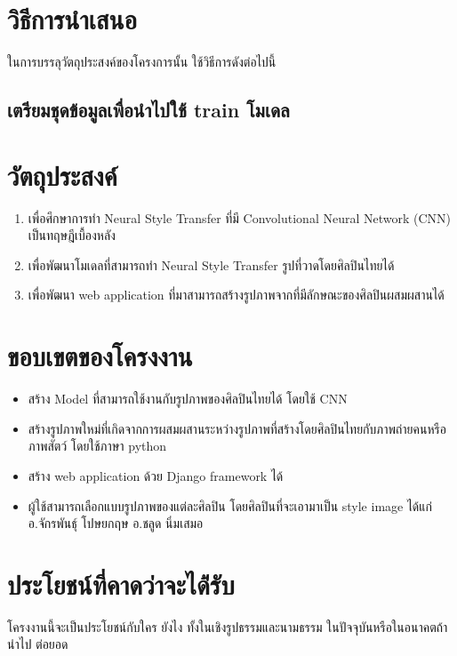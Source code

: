 \documentclass[12pt,oneside,openright,a4paper]{cpe-thai-project}
\begin{document}
\section{วิธีการนำเสนอ}
\par\setlength{\parindent}{5ex}ในการบรรลุวัตถุประสงค์ของโครงการนั้น ใช้วิธีการดังต่อไปนี้
\subsection{เตรียมชุดข้อมูลเพื่อนำไปใช้ train โมเดล}


\section{วัตถุประสงค์}
\begin{enumerate}
  \item	เพื่อศึกษาการทำ Neural Style Transfer ที่มี Convolutional Neural Network (CNN) เป็นทฤษฎีเบื้องหลัง
  \item เพื่อพัฒนาโมเดลที่สามารถทำ Neural Style Transfer รูปที่วาดโดยศิลปินไทยได้
  \item เพื่อพัฒนา web application ที่มาสามารถสร้างรูปภาพจากที่มีลักษณะของศิลปินผสมผสานได้
\end{enumerate}



\section{ขอบเขตของโครงงาน}

\begin{itemize}
\item  สร้าง Model ที่สามารถใช้งานกับรูปภาพของศิลปินไทยได้ โดยใช้ CNN 
\item  สร้างรูปภาพใหม่ที่เกิดจากการผสมผสานระหว่างรูปภาพที่สร้างโดยศิลปินไทยกับภาพถ่ายคนหรือภาพสัตว์ โดยใช้ภาษา python
\item  สร้าง web application ด้วย Django framework ได้ 
\item ผู้ใช้สามารถเลือกแบบรูปภาพของแต่ละศิลปิน โดยศิลปินที่จะเอามาเป็น style image ได้แก่ 
\subitem อ.จักรพันธุ์ โปษยกฤษ
\subitem อ.ชลูด นิ่มเสมอ
\end{itemize}

\section{ประโยชน์ที่คาดว่าจะได้่รับ}

โครงงานนี้จะเป็นประโยชน์กับใคร ยังไง ทั้งในเชิงรูปธรรมและนามธรรม ในปัจจุบันหรือในอนาคตถ้านำไป
ต่อยอด
\end{document}
